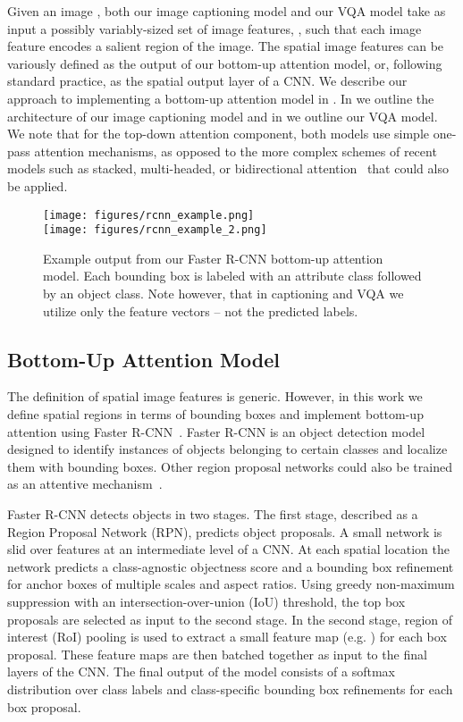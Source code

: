 \documentclass[10pt,twocolumn,letterpaper]{article}
\begin{document}
Given an image , both our image captioning model and our VQA model take as input a possibly variably-sized set of  image features, , such that each image feature encodes a salient region of the image. The spatial image features  can be variously defined as the output of our bottom-up attention model, or, following standard practice, as the spatial output layer of a CNN. We describe our approach to implementing a bottom-up attention model in . In  we outline the architecture of our image captioning model and in  we outline our VQA model. We note that for the top-down attention component, both models use simple one-pass attention mechanisms, as opposed to the more complex schemes of recent models such as stacked, multi-headed, or bidirectional attention~\cite{stacked,jabri2016revisiting,kazemi2017baseline,coatt} that could also be applied.


\begin{figure}[t]
	\begin{center}
		\texttt{[image: figures/rcnn\_example.png]}\\
\texttt{[image: figures/rcnn\_example\_2.png]}\\
\end{center}
	\caption{Example output from our Faster R-CNN bottom-up attention model. Each bounding box is labeled with an attribute class followed by an object class. Note however, that in captioning and VQA we utilize only the feature vectors -- not the predicted labels.}
	\label{fig:rcnn-demo}
\end{figure}


\subsection{Bottom-Up Attention Model}
\label{sec:rcnn}

The definition of spatial image features  is generic. However, in this work we define spatial regions in terms of bounding boxes and implement bottom-up attention using Faster R-CNN~\cite{faster_rcnn}. Faster R-CNN is an object detection model designed to identify instances of objects belonging to certain classes and localize them with bounding boxes. Other region proposal networks could also be trained as an attentive mechanism~\cite{yolo2016,liu2015ssd}.

Faster R-CNN detects objects in two stages. The first stage, described as a Region Proposal Network (RPN), predicts object proposals. A small network is slid over features at an intermediate level of a CNN. At each spatial location the network predicts a class-agnostic objectness score and a bounding box refinement for anchor boxes of multiple scales and aspect ratios. Using greedy non-maximum suppression with an intersection-over-union (IoU) threshold, the top box proposals are selected as input to the second stage. In the second stage, region of interest (RoI) pooling is used to extract a small feature map (e.g. ) for each box proposal. These feature maps are then batched together as input to the final layers of the CNN. The final output of the model consists of a softmax distribution over class labels and class-specific bounding box refinements for each box proposal. 
\end{document}
